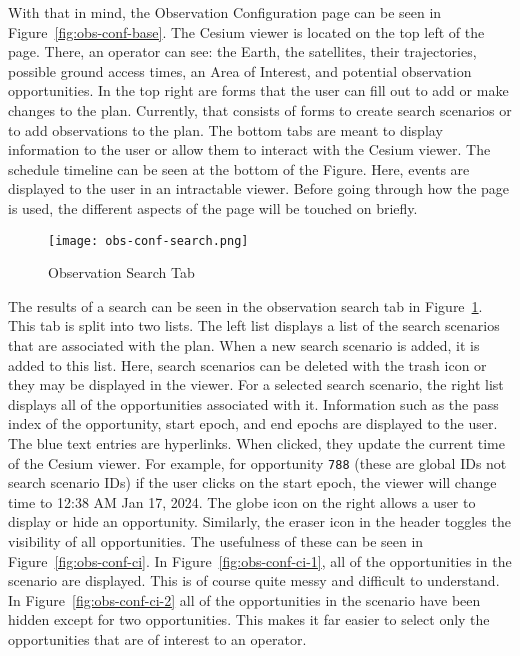 With that in mind, the Observation Configuration page can be seen in
Figure~\ref{fig:obs-conf-base}. The Cesium viewer is located on the top left of
the page.  There, an operator can see: the Earth, the satellites, their
trajectories, possible ground access times, an Area of Interest, and potential
observation opportunities. In the top right are forms that the user can fill
out to add or make changes to the plan. Currently, that consists of forms to
create search scenarios or to add observations to the plan. The bottom tabs are
meant to display information to the user or allow them to interact with the
Cesium viewer. The schedule timeline can be seen at the bottom of the Figure.
Here, events are displayed to the user in an intractable viewer. Before going
through how the page is used, the different aspects of the page will be touched
on briefly. 

\begin{figure}
    \centering
    \texttt{[image: obs-conf-search.png]} 
    \caption{Observation Search Tab}
    \label{fig:obs-conf-search} 
\end{figure}

The results of a search can be seen in the observation search tab in
Figure~\ref{fig:obs-conf-search}. This tab is split into two lists. The left
list displays a list of the search scenarios that are associated with the plan.
When a new search scenario is added, it is added to this list. Here, search
scenarios can be deleted with the trash icon or they may be displayed in the
viewer. For a selected search scenario, the right list displays all of the
opportunities associated with it. Information such as the pass index of the
opportunity, start epoch, and end epochs are displayed to the user. The blue
text entries are hyperlinks. When clicked, they update the current time of the
Cesium viewer. For example, for opportunity \texttt{788} (these are global IDs
not search scenario IDs) if the user clicks on the start epoch, the viewer will
change time to 12:38 AM Jan 17, 2024. The globe icon on the right allows a user
to display or hide an opportunity. Similarly, the eraser icon in the header
toggles the visibility of all opportunities.  The usefulness of these can be
seen in Figure~\ref{fig:obs-conf-ci}.  In Figure~\ref{fig:obs-conf-ci-1},
all of the opportunities in the scenario are displayed. This is of course quite
messy and difficult to understand. In Figure~\ref{fig:obs-conf-ci-2} all of
the opportunities in the scenario have been hidden except for two
opportunities. This makes it far easier to select only the opportunities that
are of interest to an operator.


